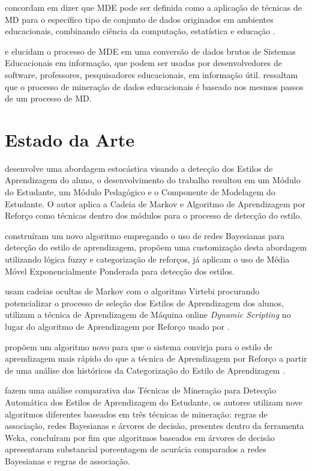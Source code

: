 \documentclass[12pt]{article}
\begin{document}
\cite{Romero_Ventura_2013} concordam em dizer que MDE pode ser definida como a aplicação de técnicas de MD para o específico tipo de conjunto de dados originados em ambientes educacionais, combinando ciência da computação, estatística e educação .

\cite{Garcia_et_al_2011} e \cite{Santos2016} elucidam o processo de MDE em uma conversão de dados brutos de Sistemas Educacionais em informação, que podem ser usadas por desenvolvedores de software, professores, pesquisadores educacionais, em informação útil. \cite{Garcia_et_al_2011} ressaltam que o processo de mineração de dados educacionais é baseado nos mesmos passos de um processo de MD.

\section{Estado da Arte}

\cite{Dorca2012} desenvolve uma abordagem estocástica visando a detecção dos Estilos de Aprendizagem do aluno, o desenvolvimento do trabalho resultou em um Módulo do Estudante, um Módulo Pedagógico e o Componente de Modelagem do Estudante. O autor aplica a Cadeia de Markov e Algoritmo de Aprendizagem por Reforço como técnicas dentro dos módulos para o processo de detecção do estilo.

\cite{Salazar_Vivas_Luciana_2017} construíram um novo algoritmo empregando o uso de redes Bayesianas para detecção do estilo de aprendizagem, \cite{Falci_et_al_2018} propõem uma customização desta abordagem utilizando lógica fuzzy e categorização de reforços, já \cite{Ribeiro_et_al_2017} aplicam o uso de Média Móvel Exponencialmente Ponderada para detecção dos estilos.

\cite{Sena_etal_2016} usam cadeias ocultas de Markov com o algoritmo Virtebi procurando potencializar o processo de seleção dos Estilos de Aprendizagem dos alunos, \cite{Silva_etal_2017} utilizam a técnica de Aprendizagem de Máquina online \textit{Dynamic Scripting} no lugar do algoritmo de Aprendizagem por Reforço usado por \cite{Dorca2012}.

\cite{Falci_et_al_2016} propõem um algoritmo novo para que o sistema convirja para o estilo de aprendizagem mais rápido do que a técnica de Aprendizagem por Reforço a partir de uma análise dos históricos da Categorização do Estilo de Aprendizagem .

\cite{Ahmad_Shamsuddin_2010} fazem uma análise comparativa das Técnicas de Mineração para Detecção Automática dos Estilos de Aprendizagem do Estudante, os autores utilizam nove algoritmos diferentes baseados em três técnicas de mineração: regras de associação, redes Bayesianas e árvores de decisão, presentes dentro da ferramenta Weka, concluíram por fim que algoritmos baseados em árvores de decisão apresentaram substancial porcentagem de acurácia comparados a redes Bayesianas e regras de associação.
\end{document}
